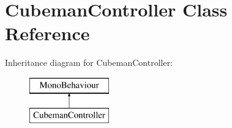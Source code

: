 \hypertarget{class_cubeman_controller}{}\section{Cubeman\+Controller Class Reference}
\label{class_cubeman_controller}
Inheritance diagram for Cubeman\+Controller\+:\begin{figure}[H]
\begin{center}
\leavevmode
\includegraphics[height=2.000000cm]{class_cubeman_controller}
\end{center}
\end{figure}
